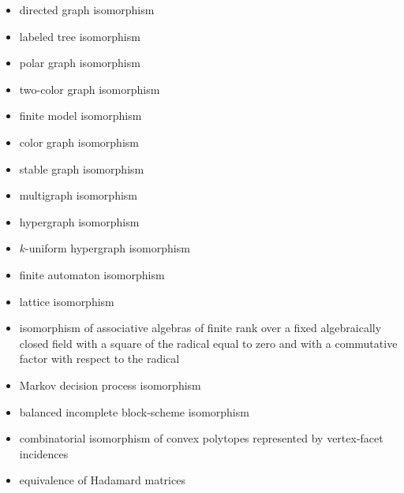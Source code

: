 \documentclass{article}
\theoremstyle{definition} \newtheorem{definition}[definition]{Definition}
\begin{document}
\begin{itemize}
\item directed graph isomorphism \cite{miller79}
\item labeled tree isomorphism \cite{babai79}
\item polar graph isomorphism \cite{zkt85}
\item two-color graph isomorphism \cite{zkt85}
\item finite model isomorphism \cite{miller79} %
\item color graph isomorphism \cite{zkt85, miller77, pultr64}
\item stable graph isomorphism \cite{wl68}
\item multigraph isomorphism \cite{zkt85} 
\item hypergraph isomorphism \cite{zkt85} 
\item $k$-uniform hypergraph isomorphism \cite{zkt85, hn70}
\item finite automaton isomorphism \cite{booth78}
\item lattice isomorphism \cite{frucht50}
\item isomorphism of associative algebras of finite rank over a fixed
  algebraically closed field with a square of the radical equal to zero and
  with a commutative factor with respect to the radical \cite{grigoriev83}
\item Markov decision process isomorphism \cite{nr08}
\item balanced incomplete block-scheme isomorphism \cite{cc81}
\item combinatorial isomorphism of convex polytopes represented by
  vertex-facet incidences \cite{ks03}
\item equivalence of Hadamard matrices \cite{mckay79}
\end{itemize}
\end{document}
